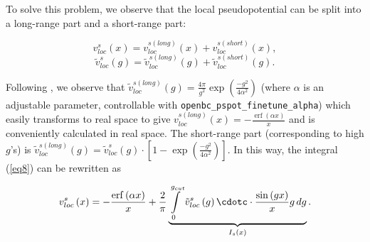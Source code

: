 \documentclass[a4paper,oneside,11pt]{article}
\newcommand{\vlocxs}{v^s_{loc}\left(x\right)}
\newcommand{\vlocxslr}{v^{s (long)}_{loc}\left(x\right)}
\newcommand{\vlocxssr}{v^{s (short)}_{loc}\left(x\right)}
\newcommand{\vlocgs}{\tilde{v}^s_{loc}\left(g\right)}
\newcommand{\vlocgslr}{\tilde{v}^{s (long)}_{loc}\left(g\right)}
\newcommand{\vlocgssr}{\tilde{v}^{s (short)}_{loc}\left(g\right)}
\begin{document}
To solve this problem, we observe that the local pseudopotential can be split into a long-range part and a short-range part:

\begin{equation}
\vlocxs = \vlocxslr + \vlocxssr,
\end{equation}
\begin{equation}
\vlocgs = \vlocgslr + \vlocgssr.
\end{equation}

Following \cite{MartynaTuckerman}, we observe that     $\vlocgslr=\frac{4\pi}{g^2}\exp{\left(\frac{-g^2}{4\alpha^2}\right)}$ (where $\alpha$ is an adjustable 
parameter, controllable with \texttt{openbc\_pspot\_finetune\_alpha}) which easily transforms to real space to give $\vlocxslr=-\frac{\operatorname{erf}{\left(\alpha{}x\right)}}{x}$ and is conveniently calculated in real space. The short-range part (corresponding to high $g$'s) is
$\vlocgslr=\vlocgs\cdot\left[1-\exp{\left(\frac{-g^2}{4\alpha^2}\right)}\right]$. In this way, the integral (\ref{eq8}) can be rewritten as

\begin{equation}
\vlocxs = 
-\frac{\operatorname{erf}{\left(\alpha{}x\right)}}{x}+
\frac{2}{\pi}
\underbrace{
\int\limits_0^{g_{cut}}
\vlocgs\cdotc
\cdot \frac{\sin\left(gx\right)}{x}g\,dg}_{I_s(x)}
.
\label{eqsplit}
\end{equation}
\end{document}

